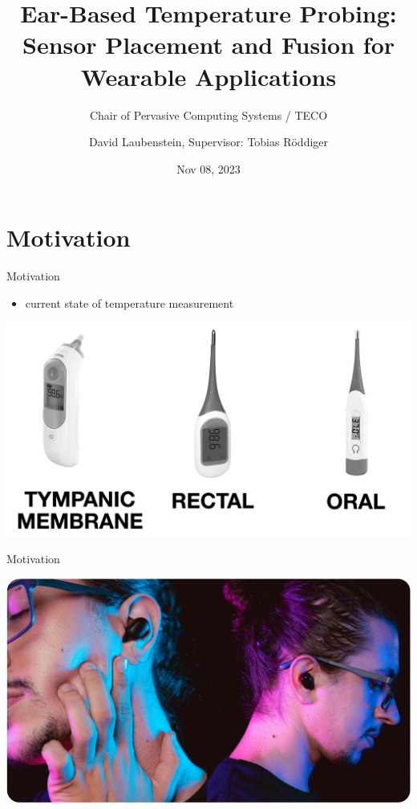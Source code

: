 \documentclass[en]{sdqbeamer}
\title[Ear-Based Temperature Probing]{Ear-Based Temperature Probing: \\ Sensor Placement and Fusion for Wearable Applications}
\subtitle{Chair of Pervasive Computing Systems / TECO}
\author[David Laubenstein]{David Laubenstein, Supervisor: Tobias Röddiger}
\date[11/08/2023]{Nov 08, 2023}
\begin{document}
 
\KITtitleframe


\section{Motivation}
\begin{frame}{Motivation}
    \begin{itemize}
        \item current state of temperature measurement \cite{TemperatureDigitalGlassa}
    \end{itemize}
    \begin{center}
        \includegraphics[scale=0.16]{proposal-presentation/images/thermometer_types.jpg}    
    \end{center}
\end{frame}

\begin{frame}{Motivation}
    \begin{center}
        \includegraphics[scale=0.16]{proposal-presentation/images/inears/earbuds_picture.jpg}
    \end{center}
\end{frame}
\end{document}
